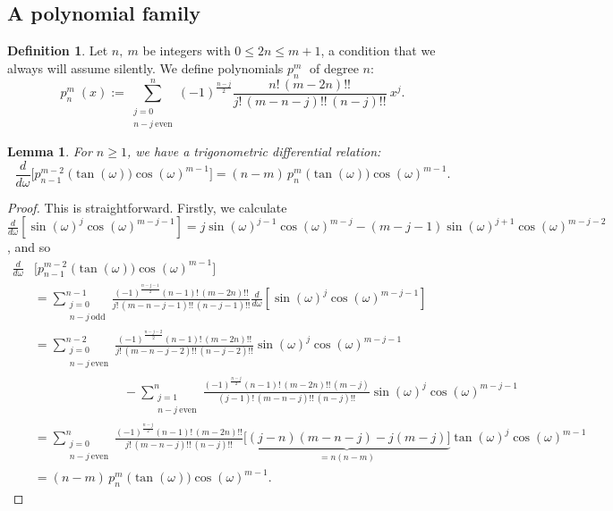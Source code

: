 \documentclass{amsart}
\newcommand{\p}[2]{p_{#1}^{#2}\;\!\!}
\newcommand{\coloneqq}{:=}
\theoremstyle{plain}
\newtheorem{lemma}[theorem]{Lemma}
\theoremstyle{definition}
\newtheorem{definition}[theorem]{Definition}
\theoremstyle{remark}
\begin{document}
\subsection{A polynomial family}
\begin{definition} Let $n,\ m$ be integers with $0\leq 2n\leq m+1$, a condition that we always will assume silently. We define polynomials $\p{n}{m}$ of degree $n$:
\begin{equation*}
\p{n}{m}(x) \coloneqq \sum_{\substack{j=0\\ n-j\ \text{even}}}^n (-1)^{\frac{n-j}{2}} \frac{n!\,(m-2n)!!}{j!\,(m-n-j)!!\,(n-j)!!}\:x^j.
\end{equation*}
\end{definition}
\begin{lemma} \label{trigonometric}
For $n\geq 1$, we have a trigonometric differential relation:
\begin{equation*}
\frac{d}{d\omega} \Big[\p{n-1}{m-2}\big(\tan(\omega)\big)\cos(\omega)^{m-1} \Big]= (n-m)\, \p{n}{m}\big(\tan(\omega)\big)\cos(\omega)^{m-1}.
\end{equation*} 
\end{lemma}
\begin{proof} This is straightforward.
Firstly, we calculate $ \frac{d}{d\omega}\! \left[\sin(\omega)^j \cos(\omega)^{m-j-1}\right] = j \sin(\omega)^{j-1} \cos(\omega)^{m-j}-(m\!-\!j\!-\!1)\sin(\omega)^{j+1} \cos(\omega)^{m-j-2}$, and so
\begin{align*}%
\frac{d}{d\omega} &\Big[\p{n-1}{m-2}\big(\tan(\omega)\big)\cos(\omega)^{m-1} \Big] 
\\&=\!\! \textstyle \sum\limits_{\substack{j=0\\ n-j\ \text{odd}}}^{n-1} \!\!\!\frac{(-1)^{\frac{n-j-1}{2}}  (n-1)!\,(m-2n)!!}{j!\,(m-n-j-1)!!\,(n-j-1)!!}\frac{d}{d\omega}\! \left[\sin(\omega)^j \cos(\omega)^{m-j-1}\right]
\\ &=\!\!\textstyle\sum\limits_{\substack{j=0\\ n-j\ \text{even}}}^{n-2} \!\!\!\frac{(-1)^{\frac{n-j-2}{2}}(n-1)!\,(m-2n)!!}{j!\,(m-n-j-2)!!\,(n-j-2)!!}\sin(\omega)^{j} \cos(\omega)^{m-j-1} \\[-3mm]
&\hspace{3cm}-\textstyle\sum\limits_{\substack{j=1\\ n-j\ \text{even}}}^{n}\!\!\! \frac{(-1)^{\frac{n-j}{2}}(n-1)!\,(m-2n)!!\,(m-j)}{(j-1)!\,(m-n-j)!!\,(n-j)!!}\sin(\omega)^{j} \cos(\omega)^{m-j-1} \\
&=\!\!\textstyle\sum\limits_{\substack{j=0\\ n-j\ \text{even}}}^{n} \!\!\!\frac{(-1)^{\frac{n-j}{2}}(n-1)!\,(m-2n)!!}{j!\,(m-n-j)!!\,(n-j)!!}\underbrace{\big[(j\!-\!n)(m\!-\!n\!-\!j)-j(m\!-\!j)\big] }_{=n(n-m)}\tan(\omega)^{j} \cos(\omega)^{m-1}
\\ &= \textstyle(n-m)\, \p{n}{m}\big(\tan(\omega)\big)\cos(\omega)^{m-1}.
\end{align*}
\end{proof}
\end{document}
